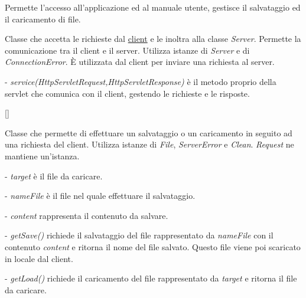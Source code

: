Permette l'accesso all'applicazione ed al manuale utente, gestisce il salvataggio ed il caricamento di file.

Classe che accetta le richieste dal \underline{client} e le inoltra alla classe \textit{Server}. Permette la comunicazione tra il client e il server.
Utilizza istanze di \textit{Server} e di \textit{ConnectionError}.
\`E utilizzata dal client per inviare una richiesta al server.
\begin{elencopuntato}[\subsubsecindent]
\item[-] \textit{service(HttpServletRequest,HttpServletResponse)} \`e il metodo proprio della servlet che comunica con il client, gestendo le richieste e le risposte. 
\end{elencopuntato}[\subsubsecindent]

Classe che permette di effettuare un salvataggio o un caricamento in seguito ad una richiesta del client.
Utilizza istanze di \textit{File}, \textit{ServerError} e \textit{Clean}.
\textit{Request} ne mantiene un'istanza.
\begin{elencopuntato}[\subsubsecindent]
\item[-] \textit{target} \`e il file da caricare.
\item[-] \textit{nameFile} \`e il file nel quale effettuare il salvataggio.
\item[-] \textit{content} rappresenta il contenuto da salvare.
\end{elencopuntato}
\begin{elencopuntato}[\subsubsecindent]
\item[-] \textit{getSave()} richiede il salvataggio del file rappresentato da \textit{nameFile} con il contenuto \textit{content} e ritorna il nome del file salvato. Questo file viene poi scaricato in locale dal client.
\item[-] \textit{getLoad()} richiede il caricamento del file rappresentato da \textit{target} e ritorna il file da caricare.
\end{elencopuntato}



